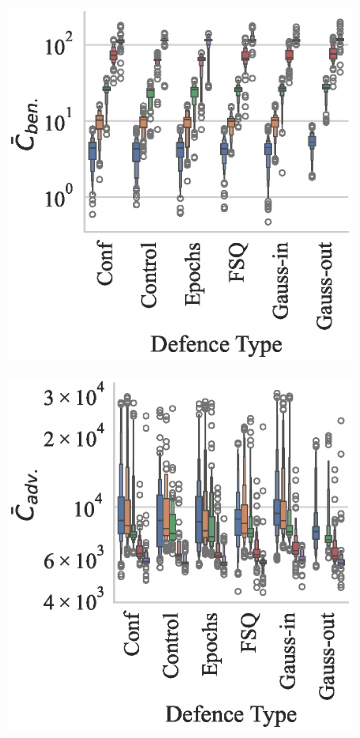 \begin{figure}
    \centering
    \begin{subfigure}{.28\textwidth}
        \centering
        \includegraphics[width=\textwidth]{cifar100_ben_failures_per_train_time_vs_defence_type.eps}
    \end{subfigure}
    \begin{subfigure}{0.28\textwidth}
        \includegraphics[width=\textwidth]{cifar100_adv_failures_per_train_time_vs_defence_type.eps}

\end{subfigure}
\end{figure}
